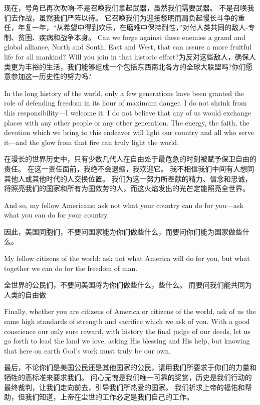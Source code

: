 \documentclass[cs4size, a4paper, 12pt]{article}
\newcounter{numpar}
\newcommand*{\newpar}{\numpar{}}
\begin{document}
	现在，号角已再次吹响-不是召唤我们拿起武器，虽然我们需要武器。 不是召唤我们去作战，虽然我们严阵以待。 它召唤我们为迎接黎明而肩负起慢长斗争的重任，年复一年，``从希望中得到欢乐，在磨难中保持耐性，''对付人类共同的敌人-专制、贫困、疾病和战争本身。  Can we forge against these enemies a grand and global alliance, North and South, East and West, that can assure a more fruitful life for all mankind? Will you join in that historic effort?为反对这些敌人，确保人类更为丰裕的生活，我们能够组成一个包括东西南北各方的全球大联盟吗?你们愿意参加这一历史性的努力吗?
	
	\newpar In the long history of the world, only a few generations have been granted the role of defending freedom in its hour of maximum danger. I do not shrink from this responsibility—I welcome it. I do not believe that any of us would exchange places with any other people or any other generation. The energy, the faith, the devotion which we bring to this endeavor will light our country and all who serve it—and the glow from that fire can truly light the world.
	
	在漫长的世界历史中，只有少数几代人在自由处于最危急的时刻被赋予保卫自由的责任。 在这一责任面前，我绝不会退缩，我欢迎它。 我不相信我们中间有人想同其他人或其他时代的人交换位置。 我们为这一努力所奉献的精力、信念和忠诚，将照亮我们的国家和所有为国效劳的人，而这火焰发出的光芒定能照亮全世界。 
	
	\newpar And so, my fellow Americans: ask not what your country can do for you—ask what you can do for your country.
	
	因此，美国同胞们，不要问国家能为你们做些什么，而要问你们能为国家做些什么。 
	
	\newpar My fellow citizens of the world: ask not what America will do for you, but what together we can do for the freedom of man.
	
	全世界的公民们，不要问美国将为你们做些什么，些什么。 而要问我们能共同为人类的自由做
	
	\newpar Finally, whether you are citizens of America or citizens of the world, ask of us the same high standards of strength and sacrifice which we ask of you. With a good conscience our only sure reward, with history the final judge of our deeds, let us go forth to lead the land we love, asking His blessing and His help, but knowing that here on earth God's work must truly be our own.
	
	最后，不论你们是美国公民还是其他国家的公民，请用我们所要求于你们的力量和牺牲的高标准来要求我们。 问心无愧是我们唯一可靠的奖赏，历史是我们行动的最终裁判，让我们走向前去，引导我们所热爱的国家。 我们祈求上帝的福佑和帮助，但我们知道，上帝在尘世的工作必定是我们自己的工作。 
	
\end{document}
